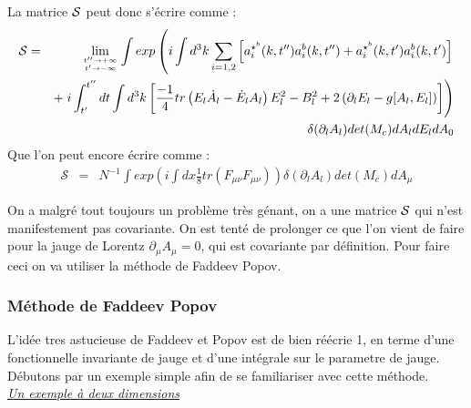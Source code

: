 \documentclass[a4paper,11pt]{article} %
\theoremstyle{plain}
\theoremstyle{definition}
\theoremstyle{remark}
\numberwithin{equation}{section}
\numberwithin{equation}{subsection}
\numberwithin{figure}{section}
\begin{document}
\noindent
La matrice $\cal{S}$ peut donc s'écrire comme :
\begin{eqnarray*}
 \mathcal{S} &=& \lim_{t'' \to + \infty \atop t' \to - \infty}
\int exp \left( 
i \int d^{3}k \sum_{i=1,2} \left[ a^{\star^{b}}_{i}(k,t'') a^{b}_{i}(k,t'') + a^{\star^{b}}_{i}(k,t') a^{b}_{i}(k,t') \right] \right. \nonumber \\ 
&& + \left. i \int^{t''}_{t'} dt \int d^{3}k 
\left[ \frac{-1}{4} tr\left(E_{l} \dot{A}_{l} - \dot{E}_{l} A_{l} \right) E^{2}_{l} - B^{2}_{l} 
+ 2 \left( \partial_{l} E_{l} - g [A_{l} , E_{l} ] \right) \right]
\right) \nonumber \\
&& \delta( \partial_{l}A_{l} ) det(M_{c}) dA_{l} dE_{l} dA_{0}
\end{eqnarray*} 
Que l'on peut encore écrire comme :
\begin{eqnarray*}
 \mathcal{S} &=& N^{-1} \int exp \left( 
i \int dx \frac{1}{8} tr \left( F_{\mu\nu} F_{\mu\nu} \right) \right) 
\delta( \partial_{l}A_{l} ) det(M_{c}) dA_{\mu}
\end{eqnarray*} 
 
\noindent
On a malgré tout toujours un problème très génant, on a une matrice $\cal{S}$  qui n'est manifestement pas covariante. On est tenté de prolonger 
ce que l'on vient de faire pour la jauge de Lorentz $\partial_{\mu} A_{\mu}=0$, qui est covariante par définition. Pour faire ceci on va utiliser 
la méthode de Faddeev Popov.

    \subsubsection{Méthode de Faddeev Popov}

\noindent
L'idée tres astucieuse de Faddeev et Popov est de bien réécrie  1, en terme d'une fonctionnelle invariante de jauge et d'une intégrale sur 
le parametre de jauge.\\
Débutons par un exemple simple afin de se familiariser avec cette méthode. \\

\noindent
\textit{\underline{Un exemple à deux dimensions}}\\
\end{document}
